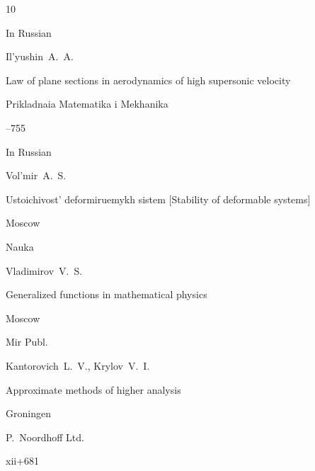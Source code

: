 \begin{thebibliography}{10}

\lang In Russian

\by Il'yushin~A.~A.

\paper Law of plane sections in aerodynamics of high supersonic velocity

\jour Prikladnaia Matematika i Mekhanika



--755







 


\lang In Russian

\by Vol'mir~A.~S.

\book  Ustoichivost' deformiruemykh sistem \rm [Stability of deformable systems]

\publaddr Moscow

\publ Nauka





 

 



 


\by Vladimirov~V.~S.

\book Generalized functions in mathematical physics


\publaddr Moscow

\publ Mir Publ.












\by Kantorovich~L.~V., Krylov~V.~I.

\book Approximate methods of higher analysis


\publaddr Groningen

\publ P.~Noordhoff Ltd.

\totalpages xii+681













\end{thebibliography}

